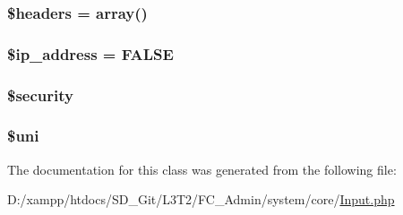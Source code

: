 \subsubsection[{\$headers}]{\setlength{\rightskip}{0pt plus 5cm}\$headers = array()\hspace{0.3cm}{\ttfamily [protected]}}\label{class_c_i___input_a52500036ee807241b8b4b7e2367c49ef}
\hypertarget{class_c_i___input_a614e10d1ab6dcf06fa7fef37af7b7eee}{}
\subsubsection[{\$ip\+\_\+address}]{\setlength{\rightskip}{0pt plus 5cm}\${\bf ip\+\_\+address} = F\+A\+L\+S\+E\hspace{0.3cm}{\ttfamily [protected]}}\label{class_c_i___input_a614e10d1ab6dcf06fa7fef37af7b7eee}
\hypertarget{class_c_i___input_a7ef3408af92597c92305e22f79e67d61}{}
\subsubsection[{\$security}]{\setlength{\rightskip}{0pt plus 5cm}\$security\hspace{0.3cm}{\ttfamily [protected]}}\label{class_c_i___input_a7ef3408af92597c92305e22f79e67d61}
\hypertarget{class_c_i___input_a6ed6e0f7f970550e288f83845eec6393}{}
\subsubsection[{\$uni}]{\setlength{\rightskip}{0pt plus 5cm}\$uni\hspace{0.3cm}{\ttfamily [protected]}}\label{class_c_i___input_a6ed6e0f7f970550e288f83845eec6393}


The documentation for this class was generated from the following file\+:\begin{DoxyCompactItemize}
\item 
D\+:/xampp/htdocs/\+S\+D\+\_\+\+Git/\+L3\+T2/\+F\+C\+\_\+\+Admin/system/core/\hyperlink{system_2core_2_input_8php}{Input.\+php}\end{DoxyCompactItemize}
